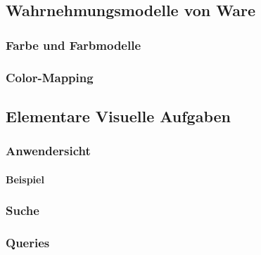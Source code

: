         \subsection{Wahrnehmungsmodelle von Ware} %

            \subsubsection{Farbe und Farbmodelle} %

            \subsubsection{Color-Mapping} %

        \subsection{Elementare Visuelle Aufgaben} %

            \subsubsection{Anwendersicht} %

                \paragraph{Beispiel} %

            \subsubsection{Suche} %

            \subsubsection{Queries} %

